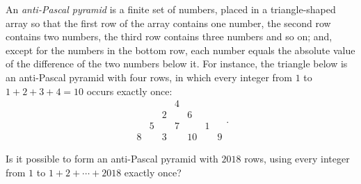 An \emph{anti-Pascal pyramid} is a finite set of numbers, placed in a triangle-shaped array so that the first row of the array contains one number, the second row contains two numbers, the third row contains three numbers and so on; and, except for the numbers in the bottom row, each number equals the absolute value of the difference of the two numbers below it. For instance, the triangle below is an anti-Pascal pyramid with four rows, in which every integer from $1$ to $1 + 2 + 3 + 4 = 10$ occurs exactly once:
\[ \begin{array}{ccccccc} & & & 4 & & & \\ & & 2 & & 6 & & \\ & 5 & & 7 & & 1 & \\ 8 & & 3 & & 10 & & 9 \end{array}. \]

Is it possible to form an anti-Pascal pyramid with $2018$ rows, using every integer from $1$ to $1 + 2 + \cdots + 2018$ exactly once?
